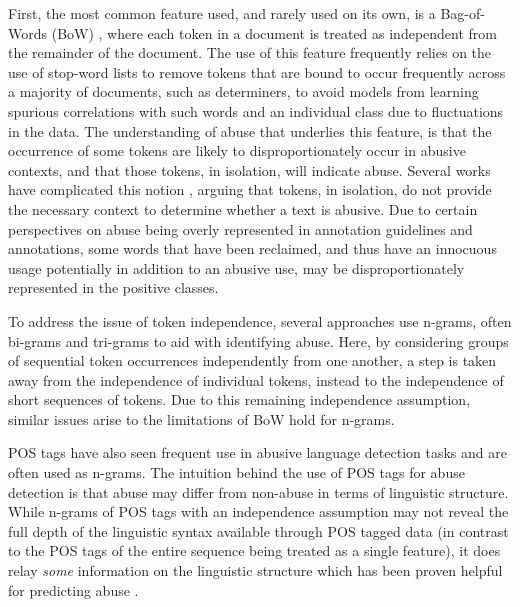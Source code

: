 First, the most common feature used, and rarely used on its own, is a Bag-of-Words (BoW) \citep{Fortuna:2018,Davidson:2017}, where each token in a document is treated as independent from the remainder of the document. The use of this feature frequently relies on the use of stop-word lists to remove tokens that are bound to occur frequently across a majority of documents, such as determiners, to avoid models from learning spurious correlations with such words and an individual class due to fluctuations in the data. The understanding of abuse that underlies this feature, is that the occurrence of some tokens are likely to disproportionately occur in abusive contexts, and that those tokens, in isolation, will indicate abuse. Several works have complicated this notion \citep[e.g.]{Waseem:2018,Davidson:2019}, arguing that tokens, in isolation, do not provide the necessary context to determine whether a text is abusive. 
Due to certain perspectives on abuse being overly represented \citep{Waseem:2016} in annotation guidelines and annotations, some words that have been reclaimed, and thus have an innocuous usage potentially in addition to an abusive use, may be disproportionately represented in the positive classes.

To address the issue of token independence, several approaches use n-grams, often bi-grams \citep{Waseem:2016} and tri-grams \citep{Davidson:2017} to aid with identifying abuse. Here, by considering groups of sequential token occurrences independently from one another, a step is taken away from the independence of individual tokens, instead to the independence of short sequences of tokens. Due to this remaining independence assumption, similar issues arise to the limitations of BoW hold for n-grams.

POS tags have also seen frequent use in abusive language detection tasks \citep{Fortuna:2018} and are often used as n-grams. The intuition behind the use of POS tags for abuse detection is that abuse may differ from non-abuse in terms of linguistic structure. While n-grams of POS tags with an independence assumption may not reveal the full depth of the linguistic syntax available through POS tagged data (in contrast to the POS tags of the entire sequence being treated as a single feature), it does relay \textit{some} information on the linguistic structure which has been proven helpful for predicting abuse \citep{Fortuna:2018}.

